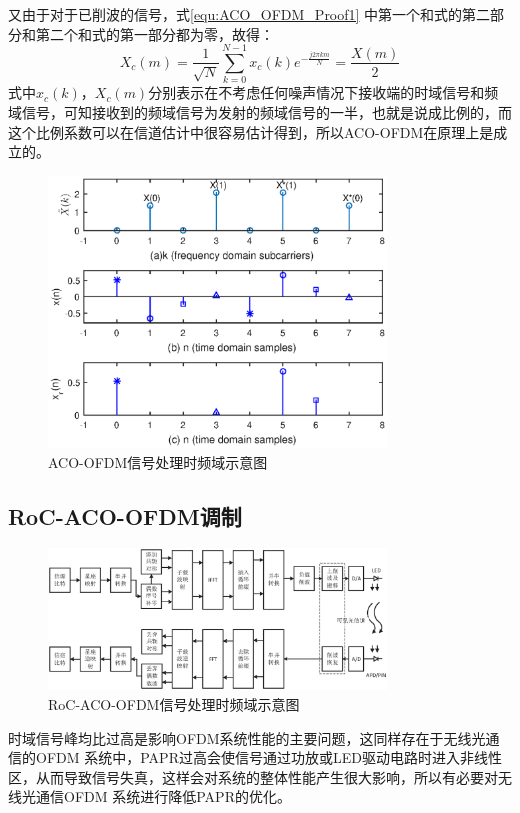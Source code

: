 又由于对于已削波的信号，式\ref{equ:ACO_OFDM_Proof1} 中第一个和式的第二部分和第二个和式的第一部分都为零，故得：
\begin{equation}
X_{c}(m)=\frac{1}{\sqrt{N}}\sum \limits_{k=0}^{N-1}x_{c}(k)e^{-\frac{j2\pi km}{N}}=\frac{X(m)}{2}
\label{equ:ACO_OFDM_Proof3}
\end{equation}
式中$x_c(k)$，$X_c(m)$分别表示在不考虑任何噪声情况下接收端的时域信号和频域信号，可知接收到的频域信号为发射的频域信号的一半，也就是说成比例的，而这个比例系数可以在信道估计中很容易估计得到，所以ACO-OFDM在原理上是成立的。
\begin{figure}[htbp]
    \centering
    \includegraphics[width=0.8\textwidth]{figures/chapter-2/ACO_OFDM.eps}
    \caption{ACO-OFDM信号处理时频域示意图}
    \label{fig:ACO_OFDM}
\end{figure}


\subsection{RoC-ACO-OFDM调制}
\begin{figure}[htbp]
    \centering
    \includegraphics[width=0.8\textwidth]{figures/chapter-2/RoC-ACO-OFDMStructure.eps}
    \caption{RoC-ACO-OFDM信号处理时频域示意图}
    \label{fig:RoC-ACO-OFDMStructure}
\end{figure}
时域信号峰均比过高是影响OFDM系统性能的主要问题，这同样存在于无线光通信的OFDM 系统中，PAPR过高会使信号通过功放或LED驱动电路时进入非线性区，从而导致信号失真，这样会对系统的整体性能产生很大影响，所以有必要对无线光通信OFDM 系统进行降低PAPR的优化。

